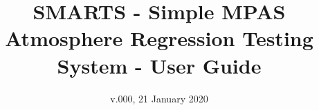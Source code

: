 \documentclass[11pt]{report}
\title{SMARTS - Simple MPAS Atmosphere Regression Testing System - User Guide}
\date{v.000, 21 January 2020}
\begin{document}
\begin{titlepage}
\maketitle
\end{titlepage}

\tableofcontents










\end{document}
